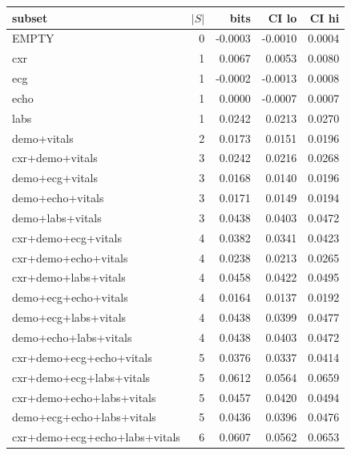 \begin{tabular}{lrrrr}
\toprule
\textbf{subset} & \textbf{$|S|$} & \textbf{bits} & \textbf{CI lo} & \textbf{CI hi} \\
\midrule
EMPTY & 0 & -0.0003 & -0.0010 & 0.0004 \\
cxr & 1 & 0.0067 & 0.0053 & 0.0080 \\
ecg & 1 & -0.0002 & -0.0013 & 0.0008 \\
echo & 1 & 0.0000 & -0.0007 & 0.0007 \\
labs & 1 & 0.0242 & 0.0213 & 0.0270 \\
demo+vitals & 2 & 0.0173 & 0.0151 & 0.0196 \\
cxr+demo+vitals & 3 & 0.0242 & 0.0216 & 0.0268 \\
demo+ecg+vitals & 3 & 0.0168 & 0.0140 & 0.0196 \\
demo+echo+vitals & 3 & 0.0171 & 0.0149 & 0.0194 \\
demo+labs+vitals & 3 & 0.0438 & 0.0403 & 0.0472 \\
cxr+demo+ecg+vitals & 4 & 0.0382 & 0.0341 & 0.0423 \\
cxr+demo+echo+vitals & 4 & 0.0238 & 0.0213 & 0.0265 \\
cxr+demo+labs+vitals & 4 & 0.0458 & 0.0422 & 0.0495 \\
demo+ecg+echo+vitals & 4 & 0.0164 & 0.0137 & 0.0192 \\
demo+ecg+labs+vitals & 4 & 0.0438 & 0.0399 & 0.0477 \\
demo+echo+labs+vitals & 4 & 0.0438 & 0.0403 & 0.0472 \\
cxr+demo+ecg+echo+vitals & 5 & 0.0376 & 0.0337 & 0.0414 \\
cxr+demo+ecg+labs+vitals & 5 & 0.0612 & 0.0564 & 0.0659 \\
cxr+demo+echo+labs+vitals & 5 & 0.0457 & 0.0420 & 0.0494 \\
demo+ecg+echo+labs+vitals & 5 & 0.0436 & 0.0396 & 0.0476 \\
cxr+demo+ecg+echo+labs+vitals & 6 & 0.0607 & 0.0562 & 0.0653 \\
\bottomrule
\end{tabular}
